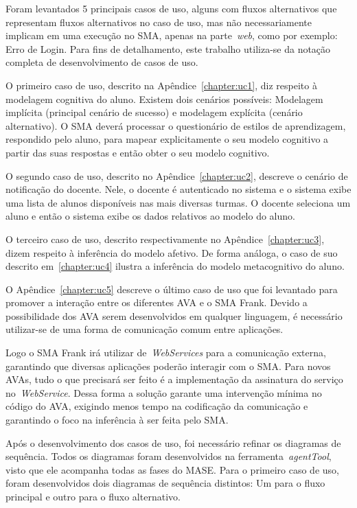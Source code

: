 Foram levantados 5 principais casos de uso, alguns com fluxos alternativos que representam fluxos alternativos no caso de uso, mas não necessariamente implicam em uma execução no SMA, apenas na parte~\emph{web}, como por exemplo: Erro de Login. Para fins de detalhamento, este trabalho utiliza-se da notação completa de desenvolvimento de casos de uso.

O primeiro caso de uso, descrito na Apêndice~\ref{chapter:uc1}, diz respeito à modelagem cognitiva do aluno. Existem dois cenários possíveis: Modelagem implícita (principal cenário de sucesso) e modelagem explícita (cenário alternativo). O SMA deverá processar o questionário de estilos de aprendizagem, respondido pelo aluno, para mapear explicitamente o seu modelo cognitivo a partir das suas respostas e então obter o seu modelo cognitivo.

O segundo caso de uso, descrito no Apêndice~\ref{chapter:uc2}, descreve o cenário de notificação do docente. Nele, o docente é autenticado no sistema e o sistema exibe uma lista de alunos disponíveis nas mais diversas turmas. O docente seleciona um aluno e então o sistema exibe os dados relativos ao modelo do aluno.

O terceiro caso de uso, descrito respectivamente no Apêndice~\ref{chapter:uc3}, dizem respeito à inferência do modelo afetivo. De forma análoga, o caso de suo descrito em~\ref{chapter:uc4} ilustra a inferência do modelo metacognitivo do aluno.

O Apêndice~\ref{chapter:uc5} descreve o último caso de uso que foi levantado para promover a interação entre os diferentes AVA e o SMA Frank. Devido a possibilidade dos AVA serem desenvolvidos em qualquer linguagem, é necessário utilizar-se de uma forma de comunicação comum entre aplicações.

Logo o SMA Frank irá utilizar de~\emph{WebServices} para a comunicação externa, garantindo que diversas aplicações poderão interagir com o SMA. Para novos AVAs, tudo o que precisará ser feito é a implementação da assinatura do serviço no~\emph{WebService}. Dessa forma a solução garante uma intervenção mínima no código do AVA, exigindo menos tempo na codificação da comunicação e garantindo o foco na inferência à ser feita pelo SMA.

Após o desenvolvimento dos casos de uso, foi necessário refinar os diagramas de sequência. Todos os diagramas foram desenvolvidos na ferramenta~\emph{agentTool}, visto que ele acompanha todas as fases do MASE. Para o primeiro caso de uso, foram desenvolvidos dois diagramas de sequência distintos: Um para o fluxo principal e outro para o fluxo alternativo.

